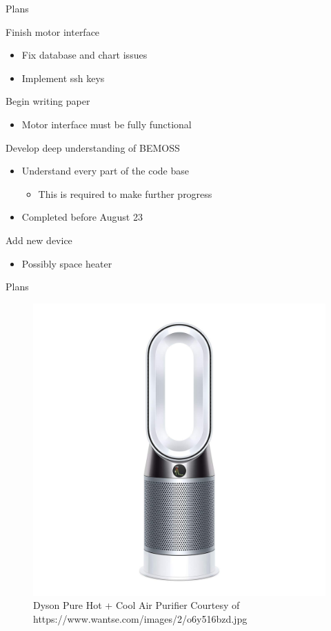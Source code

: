 \documentclass{beamer}
\begin{document}
\begin{frame}{Plans}
\begin{block}{Finish motor interface}
\begin{itemize}
\item Fix database and chart issues
\item Implement ssh keys
\end{itemize}
\end{block}
\begin{block}{Begin writing paper}
\begin{itemize}
	\item Motor interface must be fully functional
\end{itemize}
\end{block}
\begin{block}{Develop deep understanding of BEMOSS}
	\begin{itemize}
		\item Understand every part of the code base
		\begin{itemize}
			\item This is required to make further progress
		\end{itemize}
		\item Completed before August 23
	\end{itemize}
\end{block}
\begin{block}{Add new device}
\begin{itemize}
\item Possibly space heater
\end{itemize}
\end{block}
\end{frame}
\begin{frame}{Plans}
\begin{figure}
	\centering
	\includegraphics[scale=0.11]{../figs/dysonairpurifier.jpg}
	\caption{Dyson Pure Hot + Cool Air Purifier Courtesy of https://www.wantse.com/images/2/o6y516bzd.jpg}
\end{figure}
\end{frame}
\end{document}
